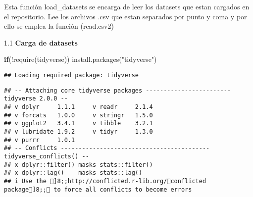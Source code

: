 \documentclass[
]{article}
\newenvironment{Shaded}{\begin{snugshade}}{\end{snugshade}}
\newcommand{\ControlFlowTok}[1]{\textcolor[rgb]{0.13,0.29,0.53}{\textbf{#1}}}
\newcommand{\FunctionTok}[1]{\textcolor[rgb]{0.00,0.00,0.00}{#1}}
\newcommand{\NormalTok}[1]{#1}
\newcommand{\OtherTok}[1]{\textcolor[rgb]{0.56,0.35,0.01}{#1}}
\newcommand{\SpecialCharTok}[1]{\textcolor[rgb]{0.00,0.00,0.00}{#1}}
\newcommand{\StringTok}[1]{\textcolor[rgb]{0.31,0.60,0.02}{#1}}
\begin{document}
\begin{Shaded}
\end{Shaded}

Esta función load\_datasets se encarga de leer los datasets que estan
cargados en el repositorio. Lee los archivos .csv que estan separados
por punto y coma y por ello se emplea la función (read.csv2)

1.1 \textbf{Carga de datasets}

\begin{Shaded}
\begin{Highlighting}[]
\ControlFlowTok{if}\NormalTok{(}\SpecialCharTok{!}\FunctionTok{require}\NormalTok{(tidyverse))}
  \FunctionTok{install.packages}\NormalTok{(}\StringTok{"tidyverse"}\NormalTok{)}
\end{Highlighting}
\end{Shaded}

\begin{verbatim}
## Loading required package: tidyverse
\end{verbatim}

\begin{verbatim}
## -- Attaching core tidyverse packages ------------------------ tidyverse 2.0.0 --
## v dplyr     1.1.1     v readr     2.1.4
## v forcats   1.0.0     v stringr   1.5.0
## v ggplot2   3.4.1     v tibble    3.2.1
## v lubridate 1.9.2     v tidyr     1.3.0
## v purrr     1.0.1     
## -- Conflicts ------------------------------------------ tidyverse_conflicts() --
## x dplyr::filter() masks stats::filter()
## x dplyr::lag()    masks stats::lag()
## i Use the ]8;;http://conflicted.r-lib.org/conflicted package]8;; to force all conflicts to become errors
\end{verbatim}
\end{document}
